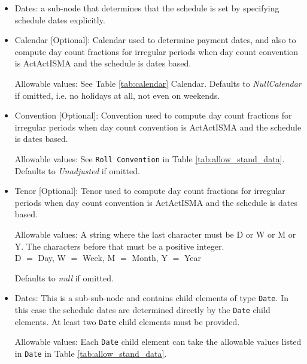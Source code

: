 \begin{itemize}

\item Dates: a sub-node that determines that the schedule is set by specifying schedule dates explicitly. 

\item Calendar [Optional]: Calendar used to determine payment dates, and also to compute day count fractions for irregular periods when day count convention is ActActISMA and the schedule is dates based. 

Allowable values: See Table \ref{tab:calendar} Calendar. Defaults to \emph{NullCalendar} if omitted, i.e. no holidays at all, not even on weekends.

\item Convention [Optional]: Convention used to compute day count fractions for irregular periods when day count convention is ActActISMA and the schedule is dates based.

Allowable values: See \lstinline!Roll Convention! in Table
\ref{tab:allow_stand_data}. Defaults to \emph{Unadjusted} if omitted.

\item Tenor [Optional]: Tenor used to compute day count fractions for irregular periods when day count convention is ActActISMA and the schedule is dates based.

Allowable values: A string where the last character must be D or W or
M or Y.  The characters before that must be a positive integer. \\D
$=$ Day, W $=$ Week, M $=$ Month, Y $=$ Year

Defaults to \emph{null} if omitted.

\item Dates: This is a sub-sub-node and contains child elements of type
  \lstinline!Date!. In this case the schedule dates are determined
  directly by the \lstinline!Date! child elements.  At least two
  \lstinline!Date! child elements must be provided.     

  Allowable values: Each \lstinline!Date!  child element can take the allowable values listed in \lstinline!Date! in
  Table \ref{tab:allow_stand_data}.

\end{itemize}



